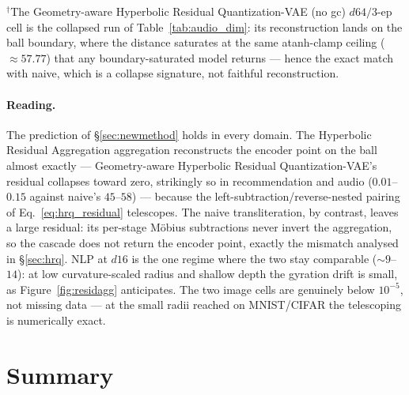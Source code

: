 \documentclass[12pt]{report}
\begin{document}
{\small $^{\dagger}$The Geometry-aware Hyperbolic Residual Quantization-VAE (no gc) $d64/3$-ep cell is the collapsed run of Table~\ref{tab:audio_dim}: its reconstruction lands on the ball boundary, where the distance saturates at the same atanh-clamp ceiling ($\approx 57.77$) that any boundary-saturated model returns --- hence the exact match with naive, which is a collapse signature, not faithful reconstruction.}

\paragraph{Reading.} The prediction of \S\ref{sec:newmethod} holds in every domain. The Hyperbolic Residual Aggregation aggregation reconstructs the encoder point on the ball almost exactly --- Geometry-aware Hyperbolic Residual Quantization-VAE's residual collapses toward zero, strikingly so in recommendation and audio ($0.01$--$0.15$ against naive's $45$--$58$) --- because the left-subtraction/reverse-nested pairing of Eq.~\ref{eq:hrq_residual} telescopes. The naive transliteration, by contrast, leaves a large residual: its per-stage M\"obius subtractions never invert the aggregation, so the cascade does not return the encoder point, exactly the mismatch analysed in \S\ref{sec:hrq}. NLP at $d16$ is the one regime where the two stay comparable ($\sim\!9$--$14$): at low curvature-scaled radius and shallow depth the gyration drift is small, as Figure~\ref{fig:residagg} anticipates. The two image cells are genuinely below $10^{-5}$, not missing data --- at the small radii reached on MNIST/CIFAR the telescoping is numerically exact.

\section{Summary}
\label{sec:exp_summary}
\end{document}
